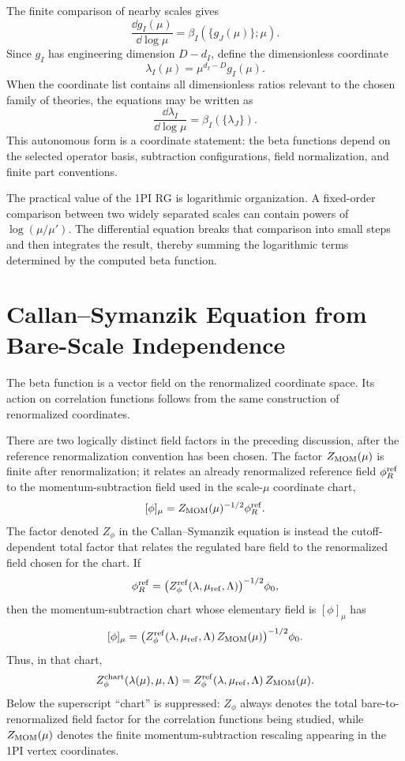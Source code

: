 The finite comparison of nearby scales gives
\[
  \frac{\dd g_I(\mu)}{\dd\log\mu}
  =
  \beta_I(\{g_J(\mu)\};\mu).
\]
Since \(g_I\) has engineering dimension \(D-d_I\), define the dimensionless
coordinate
\[
  \lambda_I(\mu)
  =
  \mu^{d_I-D}g_I(\mu).
\]
When the coordinate list contains all dimensionless ratios relevant to the
chosen family of theories, the equations may be written as
\[
  \frac{\dd\lambda_I}{\dd\log\mu}
  =
  \beta_I(\{\lambda_J\}).
\]
This autonomous form is a coordinate statement: the beta functions depend on
the selected operator basis, subtraction configurations, field normalization,
and finite part conventions.

The practical value of the 1PI RG is logarithmic organization.  A fixed-order
comparison between two widely separated scales can contain powers of
\(\log(\mu/\mu')\).  The differential equation breaks that comparison into
small steps and then integrates the result, thereby summing the logarithmic
terms determined by the computed beta function.

\section{Callan--Symanzik Equation from Bare-Scale Independence}

The beta function is a vector field on the renormalized coordinate space.  Its
action on correlation functions follows from the same construction of
renormalized coordinates.

There are two logically distinct field factors in the preceding discussion,
after the reference renormalization convention has been chosen.  The factor
\(Z_{\rm MOM}(\mu)\) is finite after renormalization; it relates an already
renormalized reference field \(\phi_R^{\rm ref}\) to the momentum-subtraction
field used in the scale-\(\mu\) coordinate chart,
\[
  [\phi]_\mu=Z_{\rm MOM}(\mu)^{-1/2}\phi_R^{\rm ref}.
\]
The factor denoted \(Z_\phi\) in the Callan--Symanzik equation is instead the
cutoff-dependent total factor that relates the regulated bare field to the
renormalized field chosen for the chart.  If
\[
  \phi_R^{\rm ref}
  =
  \bigl(Z_\phi^{\rm ref}(\lambda,\mu_{\rm ref},\Lambda)\bigr)^{-1/2}\phi_0 ,
\]
then the momentum-subtraction chart whose elementary field is \([\phi]_\mu\)
has
\[
  [\phi]_\mu
  =
  \bigl(Z_\phi^{\rm ref}(\lambda,\mu_{\rm ref},\Lambda)\,
  Z_{\rm MOM}(\mu)\bigr)^{-1/2}
  \phi_0 .
\]
Thus, in that chart,
\[
  Z_\phi^{\rm chart}(\lambda(\mu),\mu,\Lambda)
  =
  Z_\phi^{\rm ref}(\lambda,\mu_{\rm ref},\Lambda)\,Z_{\rm MOM}(\mu).
\]
Below the superscript ``chart'' is suppressed: \(Z_\phi\) always denotes the
total bare-to-renormalized field factor for the correlation functions being
studied, while \(Z_{\rm MOM}(\mu)\) denotes the finite momentum-subtraction rescaling
appearing in the 1PI vertex coordinates.


